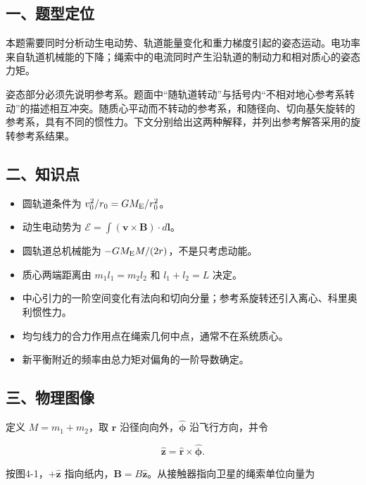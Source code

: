 \documentclass[12pt,a4paper,fontset=fandol]{ctexart}
\providecommand{\tightlist}{\setlength{\itemsep}{0pt}\setlength{\parskip}{0pt}}
\begin{document}
\subsection{一、题型定位}\label{ux4e00ux9898ux578bux5b9aux4f4d-3}

本题需要同时分析动生电动势、轨道能量变化和重力梯度引起的姿态运动。电功率来自轨道机械能的下降；绳索中的电流同时产生沿轨道的制动力和相对质心的姿态力矩。

姿态部分必须先说明参考系。题面中``随轨道转动''与括号内``不相对地心参考系转动''的描述相互冲突。随质心平动而不转动的参考系，和随径向、切向基矢旋转的参考系，具有不同的惯性力。下文分别给出这两种解释，并列出参考解答采用的旋转参考系结果。

\subsection{二、知识点}\label{ux4e8cux77e5ux8bc6ux70b9-3}

\begin{itemize}
\tightlist
\item
  圆轨道条件为 \(v_0^2/r_0=GM_{\rm E}/r_0^2\)。
\item
  动生电动势为
  \(\mathcal E=\int(\boldsymbol v\times\boldsymbol B)\cdot d\boldsymbol l\)。
\item
  圆轨道总机械能为 \(-GM_{\rm E}M/(2r)\)，不是只考虑动能。
\item
  质心两端距离由 \(m_1l_1=m_2l_2\) 和 \(l_1+l_2=L\) 决定。
\item
  中心引力的一阶空间变化有法向和切向分量；参考系旋转还引入离心、科里奥利惯性力。
\item
  均匀线力的合力作用点在绳索几何中点，通常不在系统质心。
\item
  新平衡附近的频率由总力矩对偏角的一阶导数确定。
\end{itemize}

\subsection{三、物理图像}\label{ux4e09ux7269ux7406ux56feux50cf-3}

定义 \(M=m_1+m_2\)，取 \(\hat{\boldsymbol r}\)
沿径向向外，\(\hat{\boldsymbol\phi}\) 沿飞行方向，并令

\[
\hat{\boldsymbol z}=\hat{\boldsymbol r}\times\hat{\boldsymbol\phi}.
\]

按图4-1，\(+\hat{\boldsymbol z}\)
指向纸内，\(\boldsymbol B=B\hat{\boldsymbol z}\)。从接触器指向卫星的绳索单位向量为
\end{document}
